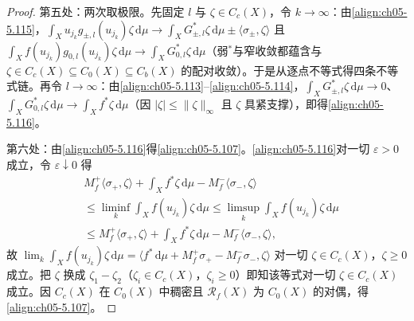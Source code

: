 \documentclass[../../main.tex]{subfiles}
\begin{document}
\begin{proof}
第五处：两次取极限。先固定 $l$ 与 $\zeta\in C_c(X)$，令 $k\to\infty$：由\eqref{align:ch05-5.115}，$\int_Xu_{j_k}g_{\pm,l}(u_{j_k})\zeta\,\mathrm{d}\mu\to\int_XG^*_{\pm,l}\zeta\,\mathrm{d}\mu\pm\langle\sigma_\pm,\zeta\rangle$ 且 $\int_Xf(u_{j_k})g_{0,l}(u_{j_k})\zeta\,\mathrm{d}\mu\to\int_XG^*_{0,l}\zeta\,\mathrm{d}\mu$（弱$^*$与窄收敛都蕴含与 $\zeta\in C_c(X)\subseteq C_0(X)\subseteq C_b(X)$ 的配对收敛）。于是从逐点不等式得四条不等式链。再令 $l\to\infty$：由\eqref{align:ch05-5.113}--\eqref{align:ch05-5.114}，$\int_XG^*_{\pm,l}\zeta\,\mathrm{d}\mu\to0$、$\int_XG^*_{0,l}\zeta\,\mathrm{d}\mu\to\int_Xf^*\zeta\,\mathrm{d}\mu$（因 $|\zeta|\leqslant\|\zeta\|_\infty$ 且 $\zeta$ 具紧支撑），即得\eqref{align:ch05-5.116}。

第六处：由\eqref{align:ch05-5.116}得\eqref{align:ch05-5.107}。\eqref{align:ch05-5.116}对一切 $\varepsilon>0$ 成立，令 $\varepsilon\downarrow0$ 得
\begin{align*}
&M^+_f\langle\sigma_+,\zeta\rangle+\int_Xf^*\zeta\,\mathrm{d}\mu-M^-_f\langle\sigma_-,\zeta\rangle\\
&\leqslant\liminf_{k}\int_Xf(u_{j_k})\zeta\,\mathrm{d}\mu
\leqslant\limsup_{k}\int_Xf(u_{j_k})\zeta\,\mathrm{d}\mu\\
&\leqslant M^+_f\langle\sigma_+,\zeta\rangle+\int_Xf^*\zeta\,\mathrm{d}\mu-M^-_f\langle\sigma_-,\zeta\rangle,
\end{align*}
故 $\lim_k\int_Xf(u_{j_k})\zeta\,\mathrm{d}\mu=\langle f^*\,\mathrm{d}\mu+M^+_f\sigma_+-M^-_f\sigma_-,\zeta\rangle$ 对一切 $\zeta\in C_c(X)$，$\zeta\geqslant0$ 成立。把 $\zeta$ 换成 $\zeta_1-\zeta_2$（$\zeta_i\in C_c(X)$，$\zeta_i\geqslant0$）即知该等式对一切 $\zeta\in C_c(X)$ 成立。因 $C_c(X)$ 在 $C_0(X)$ 中稠密且 $\mathscr{R}_f(X)$ 为 $C_0(X)$ 的对偶，得\eqref{align:ch05-5.107}。
\end{proof}
\end{document}
